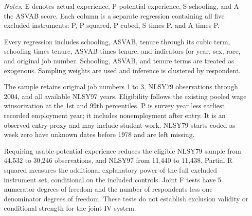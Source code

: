 \medskip
{\footnotesize
\noindent\textit{Notes.} E denotes actual experience, P potential experience, S schooling, and A the ASVAB score. Each column is a separate regression containing all five excluded instruments: P, P squared, P cubed, S times P, and A times P.\par
\smallskip\noindent Every regression includes schooling, ASVAB, tenure through its cubic term, schooling times tenure, ASVAB times tenure, and indicators for year, sex, race, and original job number. Schooling, ASVAB, and tenure terms are treated as exogenous. Sampling weights are used and inference is clustered by respondent.\par
\smallskip\noindent The sample retains original job numbers 1 to 3, NLSY79 observations through 2004, and all available NLSY97 years. Eligibility follows the existing pooled wage winsorization at the 1st and 99th percentiles. P is survey year less earliest recorded employment year; it includes nonemployment after entry. It is an observed entry proxy and may include student work. NLSY79 starts coded as week zero have unknown dates before 1978 and are left missing.\par
\smallskip\noindent Requiring usable potential experience reduces the eligible NLSY79 sample from 44,532 to 30,246 observations, and NLSY97 from 11,440 to 11,438. Partial R squared measures the additional explanatory power of the full excluded instrument set, conditional on the included controls. Joint F tests have 5 numerator degrees of freedom and the number of respondents less one denominator degrees of freedom. These tests do not establish exclusion validity or conditional strength for the joint IV system.\par
}
